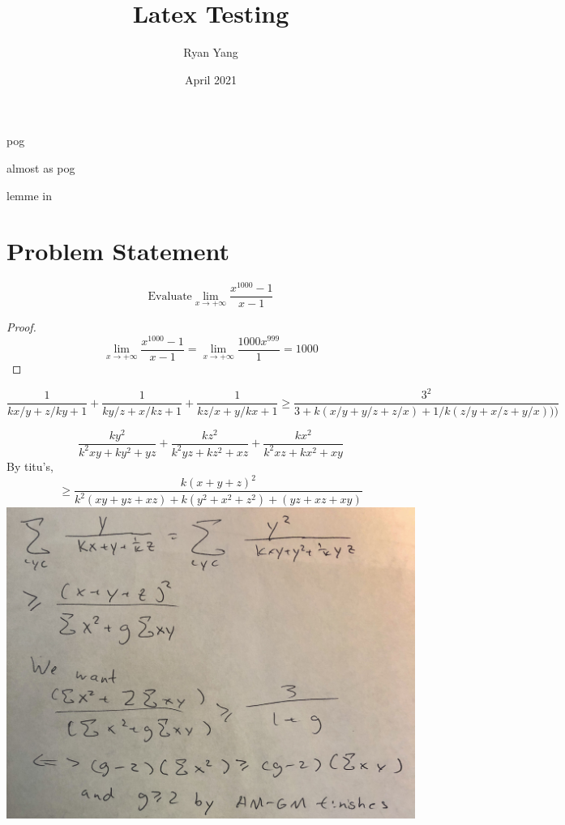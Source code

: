 \documentclass[11pt]{scrartcl}
\title{Latex Testing}
\author{Ryan Yang}
\date{April 2021}
\begin{document}
\maketitle



\begin{theorem}
pog
\end{theorem}

\begin{claim}
almost as pog
\end{claim}

\begin{lemma}
lemme in
\end{lemma}



\section{Problem Statement}
\begin{problem}
\[\text{Evaluate} \lim_{x \to +\infty} \frac{x^{1000}-1}{x-1}\]
\end{problem}

\begin{proof}
\[\lim_{x \to +\infty} \frac{x^{1000}-1}{x-1} = \lim_{x \to +\infty} \frac{1000x^{999}}{1} = 1000 \]
\end{proof}


\[\frac{1}{kx/y+z/ky+1}+\frac{1}{ky/z+x/kz+1}+\frac{1}{kz/x+y/kx+1}\geq \frac{3^2}{3+k(x/y+y/z+z/x)+1/k (z/y+x/z+y/x)))}\]

\[\frac{ky^2}{k^2xy+ky^2+yz}+\frac{kz^2}{k^2yz+kz^2+xz}+\frac{kx^2}{k^2xz+kx^2+xy}\]
By titu's,
\[\geq \frac{k(x+y+z)^2}{k^2(xy+yz+xz)+k(y^2+x^2+z^2)+(yz+xz+xy)}\]
\includegraphics[scale=0.1]{huh-a2.jpg}
\end{document}
